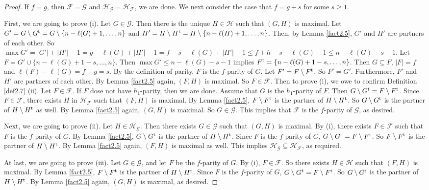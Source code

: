 \documentclass[a4paper,11pt]{article}
\begin{document}
\begin{proof}
If $f=g$, then $\mathcal{F}=\mathcal{G}$ and $\mathcal{H}_{\mathcal{G}}=\mathcal{H}_{\mathcal{F}}$, we are done. We next consider the case that $f=g+s$ for some $s\geq 1$.

First, we are going to prove (i).
Let $G\in \mathcal{G}$. Then there is the unique $H\in \mathcal{H}$ such that $(G, H)$ is maximal. Let $G'=G\setminus G^{\rm t}=G\setminus \{n-\ell(G)+1, \dots, n\}$ and $H'=H\setminus H^{\rm t}=H\setminus \{n-\ell(H)+1, \dots, n\}$. Then, by Lemma \ref{fact2.5}, $G'$ and $H'$ are partners of each other.
So $\max G'=|G'|+|H'|-1=g-\ell(G)+|H'|-1=f-s-\ell(G)+|H'|-1\leq f+h-s-\ell(G)-1\leq n-\ell(G)-s-1$.
Let $F=G'\cup \{n-\ell(G)+1-s, \dots, n\}$. Then $\max G'\leq n-\ell(G)-s-1$ implies $F^{\rm t}=\{n-\ell(G)+1-s, \dots, n\}$.  Then $G\subseteq F$, $|F|=f$ and $\ell(F)-\ell(G)=f-g=s$. By the definition of parity, $F$ is the $f$-parity of $G$.  Let $F'=F\setminus F^{\rm t}$. So $F'=G'$. Furthermore, $F'$ and $H'$ are partners of each other. By Lemma \ref{fact2.5} again, $(F, H)$ is maximal. So $F\in \mathcal{F}$. Then to prove (i), we owe to confirm Definition \ref{def2.7} (ii). Let $F\in \mathcal{F}$. If $F$ dose not have $h_1$-parity, then we are done. Assume that $G$ is the $h_1$-parity of $F$. Then $G\setminus G^{\rm t}=F\setminus F^{\rm t}$. Since $F\in \mathcal{F}$, there exists $H$ in $\mathcal{H}_{\mathcal{F}}$ such that $(F, H)$ is maximal. By Lemma \ref{fact2.5}, $F\setminus F^{\rm t}$ is the partner of $H\setminus H^{\rm t}$. So $G\setminus G^{\rm t}$ is the partner of $H\setminus H^{\rm t}$ as well. By Lemma \ref{fact2.5} again, $(G, H)$ is maximal. So $G\in \mathcal{G}$. This implies that $\mathcal{F}$ is the $f$-parity of $\mathcal{G}$, as desired.

Next, we are going to prove (ii). Let $H\in \mathcal{H}_{\mathcal{G}}$. Then there exists $G\in \mathcal{G}$ such that $(G, H)$ is maximal. By (i), there exists $F\in \mathcal{F}$ such that $F$ is the $f$-parity of $G$.
By Lemma \ref{fact2.5}, $G\setminus G^{\rm t}$ is the partner of $H\setminus H^{\rm t}$. Since
$F$ is the $f$-parity of $G$, $G\setminus G^{\rm t}=F\setminus F^{\rm t}$. So
$F\setminus F^{\rm t}$ is the partner of $H\setminus H^{\rm t}$. By Lemma \ref{fact2.5} again, $(F, H)$ is maximal as well.
This implies $\mathcal{H}_{\mathcal{G}}\subseteq \mathcal{H}_{\mathcal{F}}$, as required.

At last, we are going to prove (iii).
Let $G\in \mathcal{G}$, and let $F$ be the $f$-parity of $G$. By (i), $F\in \mathcal{F}$. So there exists $H\in \mathcal{H}$  such that $(F, H)$ is maximal.
By Lemma \ref{fact2.5}, $F\setminus F^{\rm t}$ is the partner of $H\setminus H^{\rm t}$. Since
$F$ is the $f$-parity of $G$, $G\setminus G^{\rm t}=F\setminus F^{\rm t}$. So
$G\setminus G^{\rm t}$ is the partner of $H\setminus H^{\rm t}$. By Lemma \ref{fact2.5} again,
$(G, H)$ is maximal, as desired.
\end{proof}
\end{document}
